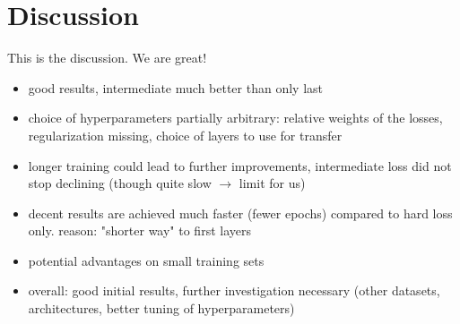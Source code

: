 \documentclass[10pt,twocolumn,letterpaper]{article}
\begin{document}



\section{Discussion}
This is the discussion. We are great!

\begin{itemize}
	\item good results, intermediate much better than only last
	\item choice of hyperparameters partially arbitrary: relative weights of the losses, regularization missing, choice of layers to use for transfer
	\item longer training could lead to further improvements, intermediate loss did not stop declining (though quite slow $ \rightarrow $ limit for us)
	\item decent results are achieved much faster (fewer epochs) compared to hard loss only. reason: "shorter way" to first layers
	\item potential advantages on small training sets
	\item overall: good initial results, further investigation necessary (other datasets, architectures, better tuning of hyperparameters)
\end{itemize}

{\small


}
\end{document}
